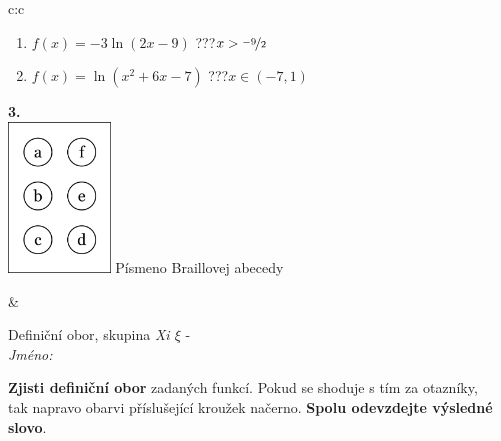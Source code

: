 \documentclass[10pt]{report}
\begin{document}
\begin{tabular}{c:c}
\begin{minipage}[c][104.5mm][t]{0.5\linewidth}
\begin{center}
\begin{minipage}{0.79\linewidth}
\begin{center}
\begin{varwidth}{\linewidth}
\begin{enumerate}
\item $f(x)=-3\ln{(2x-9)}$\quad \dotfill\; ???\;\dotfill \quad $x>\nicefrac{-9}{2}$
\item $f(x)=\ln{(x^2+6x-7)}$\quad \dotfill\; ???\;\dotfill \quad $x\in(-7 , 1)$
\end{enumerate}
\end{varwidth}
\end{center}
\end{minipage}
\begin{minipage}{0.20\linewidth}
\begin{center}
{\Huge\bfseries 3.} \\[2mm]
\includegraphics[height=40mm]{../images/braille.png}
{\small Písmeno Braillovej abecedy}
\end{center}
\end{minipage}
\end{center}
\end{minipage}
&
\begin{minipage}[c][104.5mm][t]{0.5\linewidth}
\begin{center}
\vspace{7mm}
{\huge Definiční obor, skupina \textit{Xi $\xi$} -}\\[5mm]
\textit{Jméno:}\phantom{xxxxxxxxxxxxxxxxxxxxxxxxxxxxxxxxxxxxxxxxxxxxxxxxxxxxxxxxxxxxxxxxx}\\[5mm]
\begin{minipage}{0.95\linewidth}
\begin{center}
\textbf{Zjisti definiční obor} zadaných funkcí. Pokud se shoduje s tím za otazníky,\\tak napravo obarvi příslušející kroužek načerno. \textbf{Spolu odevzdejte výsledné slovo}.
\end{center}
\end{minipage}
\\[1mm]
\begin{minipage}{0.79\linewidth}
\begin{center}
\begin{varwidth}{\linewidth}
\begin{enumerate}
\normalsizerrr

\end{enumerate}
\end{varwidth}
\end{center}
\end{minipage}
\end{center}
\end{minipage}
\end{tabular}
\end{document}
